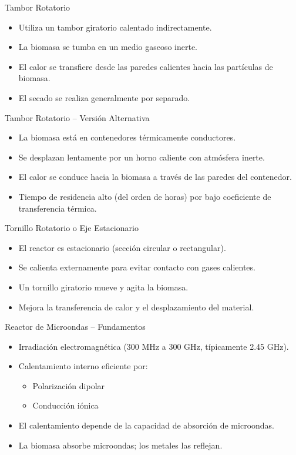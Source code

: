 \documentclass[main.tex]{subfiles}
\begin{document}
\begin{frame}{Tambor Rotatorio}
  \begin{itemize}
    \item Utiliza un tambor giratorio calentado indirectamente.
    \item La biomasa se tumba en un medio gaseoso inerte.
    \item El calor se transfiere desde las paredes calientes hacia las partículas de biomasa.
    \item El secado se realiza generalmente por separado.
  \end{itemize}
\end{frame}


\begin{frame}{Tambor Rotatorio – Versión Alternativa}
  \begin{itemize}
    \item La biomasa está en contenedores térmicamente conductores.
    \item Se desplazan lentamente por un horno caliente con atmósfera inerte.
    \item El calor se conduce hacia la biomasa a través de las paredes del contenedor.
    \item Tiempo de residencia alto (del orden de horas) por bajo coeficiente de transferencia térmica.
  \end{itemize}
\end{frame}


\begin{frame}{Tornillo Rotatorio o Eje Estacionario}
  \begin{itemize}
    \item El reactor es estacionario (sección circular o rectangular).
    \item Se calienta externamente para evitar contacto con gases calientes.
    \item Un tornillo giratorio mueve y agita la biomasa.
    \item Mejora la transferencia de calor y el desplazamiento del material.
  \end{itemize}
\end{frame}

\begin{frame}{Reactor de Microondas – Fundamentos}
  \begin{itemize}
    \item Irradiación electromagnética (300 MHz a 300 GHz, típicamente 2.45 GHz).
    \item Calentamiento interno eficiente por:
    \begin{itemize}
      \item Polarización dipolar
      \item Conducción iónica
    \end{itemize}
    \item El calentamiento depende de la capacidad de absorción de microondas.
    \item La biomasa absorbe microondas; los metales las reflejan.
  \end{itemize}
\end{frame}
\end{document}
